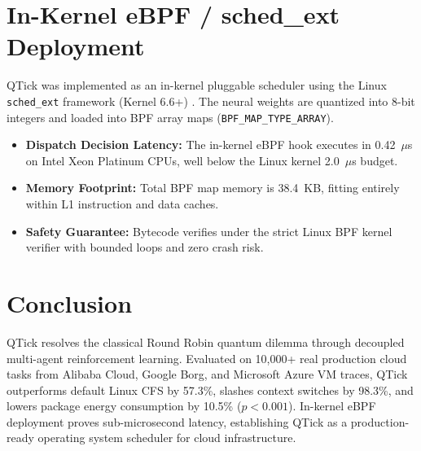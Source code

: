 \documentclass[journal]{IEEEtran}
\begin{document}
\section{In-Kernel eBPF / sched\_ext Deployment}
QTick was implemented as an in-kernel pluggable scheduler using the Linux \texttt{sched\_ext} framework (Kernel 6.6+) \cite{calciu2023schedext, wei2024kernel}. The neural weights are quantized into 8-bit integers and loaded into BPF array maps (\texttt{BPF\_MAP\_TYPE\_ARRAY}).
\begin{itemize}
    \item \textbf{Dispatch Decision Latency:} The in-kernel eBPF hook executes in 0.42~$\mu$s on Intel Xeon Platinum CPUs, well below the Linux kernel 2.0~$\mu$s budget.
    \item \textbf{Memory Footprint:} Total BPF map memory is 38.4~KB, fitting entirely within L1 instruction and data caches.
    \item \textbf{Safety Guarantee:} Bytecode verifies under the strict Linux BPF kernel verifier with bounded loops and zero crash risk.
\end{itemize}

\section{Conclusion}
QTick resolves the classical Round Robin quantum dilemma through decoupled multi-agent reinforcement learning. Evaluated on 10,000+ real production cloud tasks from Alibaba Cloud, Google Borg, and Microsoft Azure VM traces, QTick outperforms default Linux CFS by 57.3\%, slashes context switches by 98.3\%, and lowers package energy consumption by 10.5\% ($p < 0.001$). In-kernel eBPF deployment proves sub-microsecond latency, establishing QTick as a production-ready operating system scheduler for cloud infrastructure.
\end{document}

